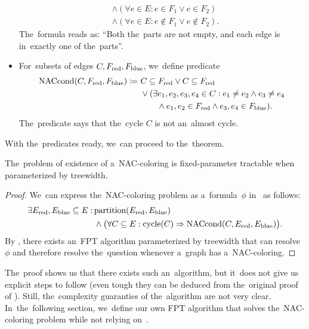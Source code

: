 \begin{itemize}
\begin{align*}
		       & \land (\forall e \in E : e \in F_1 \lor e \in F_2 )          \\
		       & \land (\forall e \in E : e \not\in F_1 \lor e \not\in F_2 ).
	      \end{align*}
	      The~formula reads as: ``Both the~parts are not empty,
	      and each edge is in~exactly one of the~parts''.
	\item For~subsets of edges \( C, F_{\text{red}}, F_{\text{blue}} \), we~define predicate
	      \begin{align*}
		      \text{NACcond}(C, F_{\text{red}}, F_{\text{blue}}) \coloneqq \ 
		       & C \subseteq F_{\text{red}} \lor C \subseteq F_{\text{red}}
		      \\
		       & \lor (\exists e_1, e_2, e_3, e_4 \in C :
		      e_1 \ne e_2 \land e_3 \ne e_4
		      \\
		       & \qquad \land e_1, e_2 \in F_{\text{red}} \land e_3, e_4 \in F_{\text{blue}} ).
	      \end{align*}
	      The~predicate says that the~cycle \( C \) is not an~almost cycle.
\end{itemize}
%

With the~predicates ready, we~can proceed to the~theorem.
%
\begin{theorem}
	The~problem of existence of a~NAC-coloring is fixed-parameter
	tractable when parameterized by treewidth.
\end{theorem}
%
\begin{proof}
	We~can express the~NAC-coloring problem
	as a~formula~\( \phi \) in~\MSO{} as follows:
	\begin{align*}
		\exists E_{\text{red}}, E_{\text{blue}} \subseteq E : \,
		 & \text{partition}(E_{\text{red}}, E_{\text{blue}}) \\
		 & \land \big(\forall C \subseteq E : \text{cycle}(C) \Rightarrow \text{NACcond}(C, E_{\text{red}}, E_{\text{blue}}) \big)
		.
	\end{align*}
	By ,
	there exists an~FPT algorithm parameterized by treewidth
	that can resolve \( \phi \) and therefore resolve the~question whenever a~graph has a~NAC-coloring.
\end{proof}
%
The~proof shows us that there exists such an~algorithm,
but it~does not give us explicit steps to follow
(even tough they can be deduced from the~original proof of ).
Still, the~complexity guaranties of the~algorithm are not very clear.
In~the~following section, we~define our
own FPT algorithm that solves the~NAC-coloring problem
while not relying on~\MSO{}.



